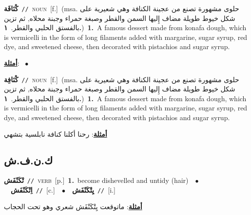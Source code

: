 \documentclass[10pt,a4paper,twoside]{article} %
\begin{document}
\begin{multicols}{2}
{\setlength\topsep{0pt}\textbf{\foreignlanguage{arabic}{كْنَافَة}}\ {\color{gray}\texttt{//}\color{black}}\ \textsc{noun}\ [f.]\ \color{gray}(msa. \foreignlanguage{arabic}{حلوى مشهورة تصنع من عجينة الكنافة وهي شعيرية على شكل خيوط طويلة مضاف إِليها السمن والقطر وصبغة حمراء وجبنة محلاه, ثم تزين بالفستق الحلبي والقطر.}~\foreignlanguage{arabic}{\textbf{١.}})\color{black}\ \textbf{1.}~A famous dessert made from konafa dough, which is vermicelli in the form of long filaments added with margarine, sugar syrup, red dye, and sweetened cheese, then decorated with pistachios and sugar syrup.\  \begin{flushright}\color{gray}\foreignlanguage{arabic}{\textbf{\underline{\foreignlanguage{arabic}{أمثلة}}}: \ $\bullet$\ \  }\end{flushright}\color{black}} \vspace{2mm}

{\setlength\topsep{0pt}\textbf{\foreignlanguage{arabic}{كْنَافِة}}\ {\color{gray}\texttt{//}\color{black}}\ \textsc{noun}\ [f.]\ \color{gray}(msa. \foreignlanguage{arabic}{حلوى مشهورة تصنع من عجينة الكنافة وهي شعيرية على شكل خيوط طويلة مضاف إِليها السمن والقطر وصبغة حمراء وجبنة محلاه, ثم تزين بالفستق الحلبي والقطر.}~\foreignlanguage{arabic}{\textbf{١.}})\color{black}\ \textbf{1.}~A famous dessert made from konafa dough, which is vermicelli in the form of long filaments added with margarine, sugar syrup, red dye, and sweetened cheese, then decorated with pistachios and sugar syrup.\  \begin{flushright}\color{gray}\foreignlanguage{arabic}{\textbf{\underline{\foreignlanguage{arabic}{أمثلة}}}: رحنا أكلنا كنافة نابلسية بتشهي}\end{flushright}\color{black}} \vspace{2mm}

\vspace{-3mm}
\subsection*{\color{blue}\foreignlanguage{arabic}{ك.ن.ف.ش}\color{blue}{}} 

{\setlength\topsep{0pt}\textbf{\foreignlanguage{arabic}{تْكَنْفَش}}\ {\color{gray}\texttt{//}\color{black}}\ \textsc{verb}\ [p.]\ \textbf{1.}~become dishevelled and untidy (hair)\ \ $\bullet$\ \ \setlength\topsep{0pt}\textbf{\foreignlanguage{arabic}{اِتْكَنْفَش}}\ {\color{gray}\texttt{//}\color{black}}\ [c.]\ \ $\bullet$\ \ \setlength\topsep{0pt}\textbf{\foreignlanguage{arabic}{يِتْكَنْفَش}}\ {\color{gray}\texttt{//}\color{black}}\ [i.]\  \begin{flushright}\color{gray}\foreignlanguage{arabic}{\textbf{\underline{\foreignlanguage{arabic}{أمثلة}}}: ماتوقعت يِتْكَنْفَش شعري وهو تحت الحجاب}\end{flushright}\color{black}} \vspace{2mm}


\end{multicols}
\end{document}
